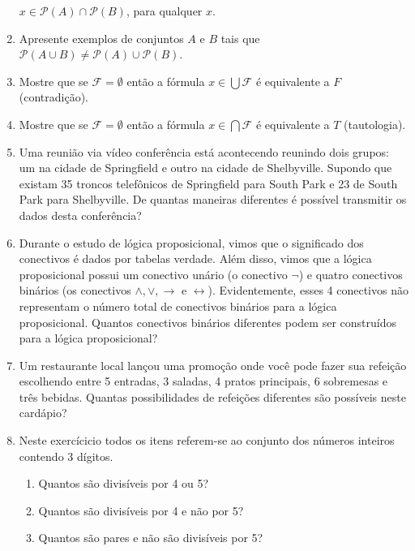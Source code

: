 \documentclass[11pt,a4paper]{report}
\begin{document}
\begin{enumerate}
              $x\in\mathcal{P}(A)\cap\mathcal{P}(B)$, para qualquer $x$.
        \item Apresente exemplos de conjuntos $A$ e $B$ tais que $\mathcal{P}(A\cup B)\neq \mathcal{P}(A) \cup \mathcal{P}(B)$.
	\item Mostre que se $\mathcal{F} = \emptyset$  ent\~ao a f\'ormula $x\in\bigcup\mathcal{F}$ \'e 
              equivalente a $F$ (contradi\c{c}\~ao).
	\item Mostre que se $\mathcal{F} = \emptyset$  ent\~ao a f\'ormula $x\in\bigcap\mathcal{F}$ \'e 
              equivalente a $T$ (tautologia).
	\item Uma reuni\~ao via v\'ideo confer\^encia est\'a acontecendo reunindo dois grupos: um na cidade de 
              Springfield e outro na cidade de Shelbyville. Supondo que existam 35 troncos telef\^onicos de 
              Springfield para South Park e 23 de South Park para Shelbyville. De
  	      quantas maneiras diferentes \'e poss\'ivel transmitir os dados desta confer\^encia?
	\item Durante o estudo de l\'ogica proposicional, vimos que o significado dos conectivos \'e dados por tabelas verdade. 
              Al\'em disso, vimos que a l\'ogica proposicional possui um conectivo un\'ario (o conectivo $\neg$) e 
              quatro conectivos bin\'arios (os conectivos
	      $\land,\lor,\rightarrow$ e $\leftrightarrow$). Evidentemente, esses 4 conectivos n\~ao representam o n\'umero total 
              de conectivos 
	      bin\'arios para a l\'ogica proposicional. Quantos conectivos bin\'arios diferentes podem ser 
              constru\'idos para a l\'ogica proposicional?
	\item Um restaurante local lan\c{c}ou uma promo\c{c}\~ao onde voc\^e pode fazer sua refei\c{c}\~ao 
              escolhendo entre 5 entradas, 3 
	      saladas, 4 pratos principais, 6 sobremesas e tr\^es bebidas. Quantas possibilidades de 
              refei\c{c}\~oes diferentes s\~ao poss\'iveis
	      neste card\'apio?
	\item Neste exerc\'icicio todos os itens referem-se ao conjunto dos n\'umeros inteiros contendo 3 d\'igitos. 
	\begin{enumerate} 
		\item Quantos s\~ao divis\'iveis por 4 ou 5?
		\item Quantos s\~ao divis\'iveis por 4 e n\~ao por 5?
		\item Quantos s\~ao pares e n\~ao s\~ao divis\'iveis por 5?
	\end{enumerate}

\end{enumerate}
\end{document}
